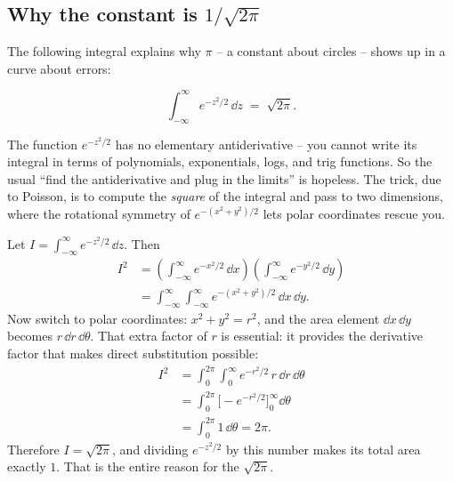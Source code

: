 \subsection{Why the constant is \texorpdfstring{$1/\sqrt{2\pi}$}{1/sqrt(2 pi)}}
\label{ch12:gaussianintegral}

The following integral explains why $\pi$ -- a constant about circles -- shows up in a curve about errors:

\begin{theorem}
\label{ch12:thm-gaussint}
\[
  \int_{-\infty}^{\infty} e^{-z^2/2}\,\dd z \;=\; \sqrt{2\pi}.
\]
\end{theorem}

\begin{whybox}
The function $e^{-z^2/2}$ has no elementary antiderivative -- you cannot write its
integral in terms of polynomials, exponentials, logs, and trig functions. So the
usual ``find the antiderivative and plug in the limits'' is hopeless. The trick,
due to Poisson, is to compute the \emph{square} of the integral and pass to two
dimensions, where the rotational symmetry of $e^{-(x^2+y^2)/2}$ lets polar
coordinates rescue you.

Let $I = \int_{-\infty}^{\infty} e^{-z^2/2}\,\dd z$. Then
\begin{align*}
  I^2 &= \left(\int_{-\infty}^{\infty} e^{-x^2/2}\,\dd x\right)
         \left(\int_{-\infty}^{\infty} e^{-y^2/2}\,\dd y\right) \\
      &= \int_{-\infty}^{\infty}\!\int_{-\infty}^{\infty} e^{-(x^2+y^2)/2}\,\dd x\,\dd y.
\end{align*}
Now switch to polar coordinates: $x^2 + y^2 = r^2$, and the area element
$\dd x\,\dd y$ becomes $r\,\dd r\,\dd\theta$. That extra factor of $r$ is
essential: it provides the derivative factor that makes direct substitution possible:
\begin{align*}
  I^2 &= \int_{0}^{2\pi}\!\int_{0}^{\infty} e^{-r^2/2}\, r\,\dd r\,\dd\theta \\
      &= \int_{0}^{2\pi}\!\Big[ -e^{-r^2/2}\Big]_{0}^{\infty}\dd\theta \\
      &= \int_{0}^{2\pi} 1\,\dd\theta = 2\pi.
\end{align*}
Therefore $I = \sqrt{2\pi}$, and dividing $e^{-z^2/2}$ by this number makes its
total area exactly $1$. That is the entire reason for the $\sqrt{2\pi}$.
\end{whybox}

